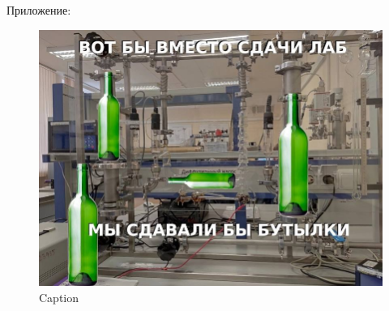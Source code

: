 \documentclass[xcolor=table]{beamer}
\begin{document}
\begin{frame}{Приложение:}
    \begin{figure}
        \centering
        \includegraphics[scale=0.4]{images/photo_2023-02-18_00-12-39.jpg}
        \caption{Caption}
        \label{fig:my_label}
    \end{figure}
\end{frame}
\end{document}
